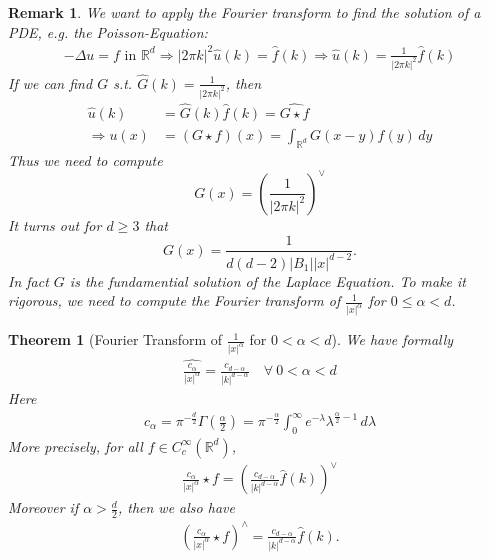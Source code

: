 \documentclass{report}
\theoremstyle{tommy}
\newtheorem{thm}[defn]{Theorem}
\newtheorem{rem}[defn]{Remark}
\newcommand{\Rd}{\mathbb{R}^d}
\begin{document}
  \begin{rem}
    We want to apply the Fourier transform to find the solution of a PDE, e.g. the Poisson-Equation:
    \begin{align*}
      - \Delta u = f \text{ in } \mathbb{R}^d
      \Rightarrow | 2 \pi k|^2 \hat u (k) = \hat f(k)
      \Rightarrow \hat u(k) = \frac{1}{|2 \pi k|^2} \hat f(k) 
    \end{align*}
    If we can find \(G\) s.t. \(\hat G(k)  = \frac{1}{|2 \pi k|^2}\), then
    \begin{align*}
      \hat u(k) &= \hat G(k) \hat f(k) = \widehat{G \star f} \\
      \Rightarrow u(x) &= (G \star f) (x) = \int_{\Rd} G(x-y)f(y)\, dy
    \end{align*}
    Thus we need to compute 
    \[G(x) = \left(\frac{1}{|2 \pi k|^2}\right)^\lor\]
    It turns out for \(d \ge 3\) that 
    \[G(x) = \frac{1}{d(d-2)|B_1||x|^{d-2}}.\]
    In fact \(G\) is the fundamential solution of the Laplace Equation. To make it rigorous, we need to compute the Fourier transform of \(\frac{1}{|x|^\alpha}\) for \(0 \le \alpha < d\).
  \end{rem}

  \begin{thm}[Fourier Transform of \(\frac{1}{|x|^\alpha}\) for \(0 < \alpha < d\)] We have formally
    \begin{align*}
      \widehat{\frac{c_\alpha}{|x|^\alpha}} = \frac{c_{d-\alpha}}{|k|^{d - \alpha}} \quad \forall\ 0 < \alpha < d
    \end{align*}
    Here
    \begin{align*}
      c_\alpha = \pi^{- \frac{d}{2}} \Gamma \left(\frac{\alpha}{2} \right) = \pi^{- \frac{\alpha}{2}} \int_0^\infty e^{-\lambda} \lambda^{\frac{\alpha}{2}-1} \, d\lambda
    \end{align*}
    More precisely, for all \(f \in C_c^\infty(\mathbb{R}^d)\), 
    \begin{align*}
      \frac{c_\alpha}{|x|^\alpha}\star f = \left(\frac{c_{d-\alpha}}{|k|^{d - \alpha}} \hat f (k)\right)^\lor
    \end{align*}
    Moreover if \(\alpha > \frac{d}{2}\), then we also have
    \begin{align*}
      \left(\frac{c_\alpha}{|x|^\alpha} \star f\right)^\land = \frac{c_{d - \alpha}}{|k|^{d-\alpha}} \hat f (k).
    \end{align*}
  \end{thm}
\end{document}
